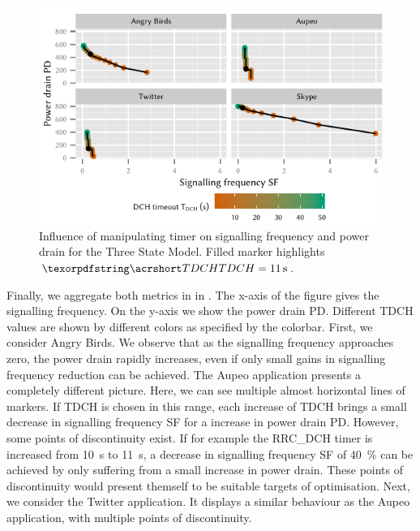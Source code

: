 \begin{figure}
	\centering
	\includegraphics{network/network_traces/numerical_results/figures/3_state_signalling_vs_power_consumption}
	\caption{Influence of manipulating  timer on signalling frequency  and power drain  for the Three State Model. Filled marker highlights \(\headershortacr{TDCH} = \SI{11}{\second}\).}\label{fig:network:network_traces:numerical_results:three_states:trade_off}
\end{figure}
Finally, we aggregate both metrics in in .
The x-axis of the figure gives the signalling frequency.
On the y-axis we show the power drain \gls{PD}.
Different \gls{TDCH} values are shown by different colors as specified by the colorbar.
First, we consider Angry Birds.
We observe that as the signalling frequency approaches zero, the power drain rapidly increases, even if only small gains in signalling frequency reduction can be achieved.
The Aupeo application presents a completely different picture.
Here, we can see multiple almost horizontal lines of markers.
If \gls{TDCH} is chosen in this range, each increase of \gls{TDCH} brings a small decrease in signalling frequency \gls{SF} for a increase in power drain \gls{PD}.
However, some points of discontinuity exist.
If for example the \gls{RRC_DCH} timer is increased from \SI{10}{\second} to \SI{11}{\second}, a decrease in signalling frequency \gls{SF} of \SI{40}{\percent} can be achieved by only suffering from a small increase in power drain.
These points of discontinuity would present themself to be suitable targets of optimisation.
Next, we consider the Twitter application.
It displays a similar behaviour as the Aupeo application, with multiple points of discontinuity.

